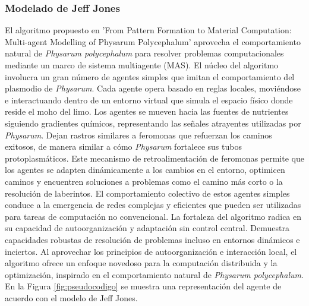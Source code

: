 \clearpage
\subsubsection{Modelado de Jeff Jones} %
\label{ssub:jones}
    El algoritmo propuesto en 'From Pattern Formation to Material Computation: Multi-agent Modelling of Physarum Polycephalum' 
        \cite{Jones2015} aprovecha el comportamiento natural de \textit{Physarum polycephalum} para resolver problemas 
        computacionales mediante un marco de sistema multiagente (MAS). El n\'ucleo del algoritmo involucra un gran n\'umero de 
        agentes simples que imitan el comportamiento del plasmodio de \textit{Physarum}. Cada agente opera basado en reglas 
        locales, movi\'endose e interactuando dentro de un entorno virtual que simula el espacio f\'isico donde reside el moho del limo.
    \vskip 0.5cm
    Los agentes se mueven hacia las fuentes de nutrientes siguiendo gradientes qu\'imicos, representando las se\~nales atrayentes 
        utilizadas por \textit{Physarum}. Dejan rastros similares a feromonas que refuerzan los caminos exitosos, de manera similar 
        a c\'omo \textit{Physarum} fortalece sus tubos protoplasm\'aticos. Este mecanismo de retroalimentaci\'on de feromonas permite 
        que los agentes se adapten din\'amicamente a los cambios en el entorno, optimicen caminos y encuentren soluciones a 
        problemas como el camino m\'as corto o la resoluci\'on de laberintos. El comportamiento colectivo de estos agentes 
        simples conduce a la emergencia de redes complejas y eficientes que pueden ser utilizadas para tareas de computaci\'on no convencional.
    \vskip 0.5cm
    La fortaleza del algoritmo radica en su capacidad de autoorganizaci\'on y adaptaci\'on sin control central. 
        Demuestra capacidades robustas de resoluci\'on de problemas incluso en entornos din\'amicos e inciertos. Al aprovechar 
        los principios de autoorganizaci\'on e interacci\'on local, el algoritmo ofrece un enfoque novedoso para la computaci\'on 
        distribuida y la optimizaci\'on, inspirado en el comportamiento natural de \textit{Physarum polycephalum}.
    \vskip 0.5cm
    En la Figura \ref{fig:pseudocodigo} se muestra una representaci\'on del agente de acuerdo con el modelo de Jeff Jones.
